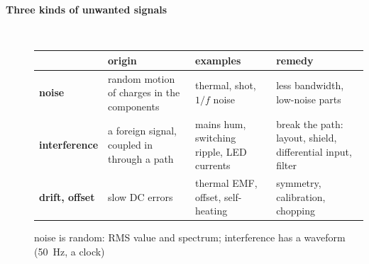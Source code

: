 \begin{description}
\item[{\rot\bf Three kinds of unwanted signals}]~\\[-\lblskip]
\begin{center}
\small
\begin{tabular}{>{\raggedright}p{2.2cm}>{\raggedright}p{4.3cm}>{\raggedright}p{4.0cm}>{\raggedright\arraybackslash}p{4.4cm}}
\toprule
 & \textbf{origin} & \textbf{examples} & \textbf{remedy} \\
\midrule
\textbf{noise} & random motion of charges in the components & thermal, shot, $1/f$ noise & less bandwidth, low-noise parts \\
\textbf{interference} & a foreign signal, coupled in through a path & mains hum, switching ripple, LED currents & break the path: layout, shield, differential input, filter \\
\textbf{drift, offset} & slow DC errors & thermal EMF, offset, self-heating & symmetry, calibration, chopping \\
\bottomrule
\end{tabular}
\end{center}
\bi
	\ite noise is random: RMS value and spectrum; interference has a waveform (\SI{50}{\hertz}, a clock)
\ei
\os{\newpage}


\end{description}
